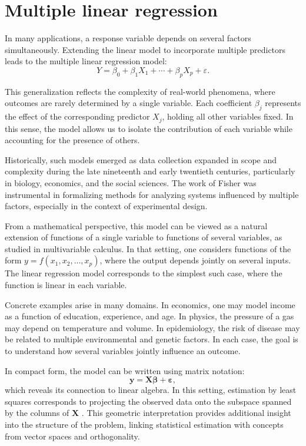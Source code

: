 \section{Multiple linear regression}

In many applications, a response variable depends on several factors simultaneously. Extending the linear model to incorporate multiple predictors leads to the multiple linear regression model:
\[
Y = \beta_0 + \beta_1 X_1 + \cdots + \beta_p X_p + \varepsilon.
\]

This generalization reflects the complexity of real-world phenomena, where outcomes are rarely determined by a single variable. Each coefficient \(\beta_j\) represents the effect of the corresponding predictor \(X_j\), holding all other variables fixed. In this sense, the model allows us to isolate the contribution of each variable while accounting for the presence of others.

\medskip

Historically, such models emerged as data collection expanded in scope and complexity during the late nineteenth and early twentieth centuries, particularly in biology, economics, and the social sciences. The work of Fisher \cite{fisher_1925_statistical} was instrumental in formalizing methods for analyzing systems influenced by multiple factors, especially in the context of experimental design.

\medskip

From a mathematical perspective, this model can be viewed as a natural extension of functions of a single variable to functions of several variables, as studied in multivariable calculus. In that setting, one considers functions of the form \(y = f(x_1, x_2, \dots, x_p)\), where the output depends jointly on several inputs. The linear regression model corresponds to the simplest such case, where the function is linear in each variable.

\medskip

Concrete examples arise in many domains. In economics, one may model income as a function of education, experience, and age. In physics, the pressure of a gas may depend on temperature and volume. In epidemiology, the risk of disease may be related to multiple environmental and genetic factors. In each case, the goal is to understand how several variables jointly influence an outcome.

\medskip

In compact form, the model can be written using matrix notation:
\[
\mathbf{y} = \mathbf{X}\boldsymbol{\beta} + \boldsymbol{\varepsilon},
\]
which reveals its connection to linear algebra. In this setting, estimation by least squares corresponds to projecting the observed data onto the subspace spanned by the columns of \(\mathbf{X}\) \cite{strang_2016_linear}. This geometric interpretation provides additional insight into the structure of the problem, linking statistical estimation with concepts from vector spaces and orthogonality.

